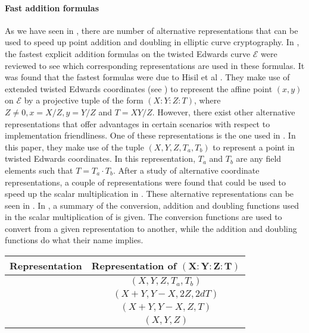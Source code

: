\paragraph{Fast addition formulas}
As we have seen in , there are number of alternative representations that can be used to speed up point addition and doubling in elliptic curve cryptography.
In \cite{costello2015fourq}, the fastest explicit addition formulas on the twisted Edwards curve $\mathcal{E}$ were reviewed to see which corresponding representations are used in these formulas.
It was found that the fastest formulas were due to Hisil et al \cite{hisil2008twisted}. 
They make use of extended twisted Edwards coordinates (see ) to represent the affine point $(x,y)$ on $\mathcal{E}$ by a projective tuple of the form $(X : Y : Z : T)$, where $Z \neq 0, x = X/Z, y = Y/Z$ and $T = XY/Z$.
However, there exist other alternative representations that offer advantages in certain scenarios with respect to implementation friendliness.
One of these representations is the one used in \cite[§3.2]{hamburg2012fast}.
In this paper, they make use of the tuple $(X, Y, Z, T_a, T_b)$ to represent a point in twisted Edwards coordinates.
In this representation, $T_a$ and $T_b$ are any field elements such that $T = T_a \cdot T_b$.
After a study of alternative coordinate representations, a couple of representations were found that could be used to speed up the scalar multiplication in {\fourq} \cite[§3.2]{costello2015fourq}.
These alternative representations can be seen in . 
In , a summary of the conversion, addition and doubling functions used in the scalar multiplication of {\fourq} is given. 
The conversion functions are used to convert from a given representation to another, while the addition and doubling functions do what their name implies. 
%
\begin{table}
	\centering
	\begin{tabular}{cc}
		\toprule
		\textbf{Representation} & \textbf{Representation of} $\bm{(X : Y : Z : T)}$ \\
		\midrule
		\bm{$R_1$} &  $(X, Y, Z, T_a, T_b)$ \\
		\bm{$R_2$} &  $(X + Y, Y - X, 2Z, 2dT)$ \\
		\bm{$R_3$} & $(X + Y, Y - X, Z, T)$ \\
		\bm{$R_4$} & $(X, Y, Z)$ \\
		\bottomrule
	\end{tabular}
	\label{table: alternative representations extended twisted Edwards coordinates}
\end{table}
